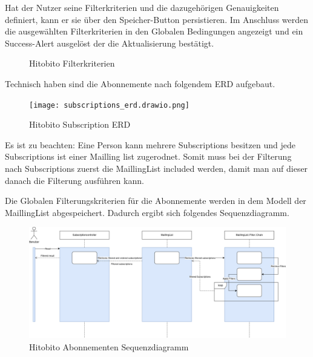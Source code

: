 \newpage

Hat der Nutzer seine Filterkriterien und die dazugehörigen Genauigkeiten definiert, kann er sie über den
Speicher-Button persistieren. Im Anschluss werden die ausgewählten Filterkriterien in den Globalen Bedingungen angezeigt
und ein Success-Alert ausgelöst der die Aktualisierung bestätigt.
\begin{figure}[h]
   \centering
   \caption{Hitobito Filterkriterien}
\end{figure}

Technisch haben sind die Abonnemente nach folgendem ERD aufgebaut.
\begin{figure}[h]
   \centering
   \texttt{[image: subscriptions\_erd.drawio.png]}
   \caption{Hitobito Subscription ERD}
\end{figure}

Es ist zu beachten: Eine Person kann mehrere Subscriptions besitzen und jede Subscriptions ist einer
Mailling list zugerodnet. Somit muss bei der Filterung nach Subscriptions zuerst die MaillingList included
werden, damit man auf dieser danach die Filterung ausführen kann.

\newpage

Die Globalen Filterungskriterien für die Abonnemente werden in dem Modell der MaillingList
abgespeichert. Dadurch ergibt sich folgendes Sequenzdiagramm.
\begin{figure}[h]
   \centering
   \includegraphics[width=1\textwidth,]{subscriptions_filter.drawio.png}
   \caption{Hitobito Abonnementen Sequenzdiagramm}
\end{figure}

